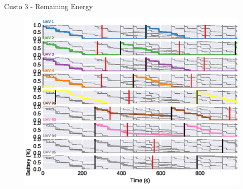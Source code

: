 \begin{frame}{Custo 3 - Remaining Energy}
            \begin{figure}[!htb]
                    \includegraphics[width=\textwidth]{custo_3/uav_remaining_energy_all.eps}
                \end{figure}
        \end{frame}